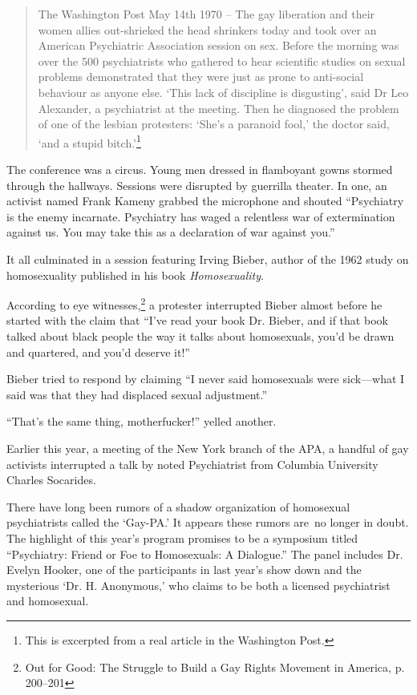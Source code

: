 \begin{quote}

The Washington Post May 14th 1970 -- The gay liberation and their women allies out-shrieked the head shrinkers today and took over an American Psychiatric Association session on sex. Before the morning was over the 500 psychiatrists who gathered to hear scientific studies on sexual problems demonstrated that they were just as prone to anti-social behaviour as anyone else. `This lack of discipline is disgusting', said Dr Leo Alexander, a psychiatrist at the meeting. Then he diagnosed the problem of one of the lesbian protesters: `She's a paranoid fool,' the doctor said, `and a stupid bitch.'\footnote{This is excerpted from a real article in the Washington Post.}
\end{quote}

The conference was a circus. Young men dressed in flamboyant gowns stormed through the hallways. Sessions were disrupted by guerrilla theater. In one, an activist named Frank Kameny grabbed the microphone and shouted ``Psychiatry is the enemy incarnate. Psychiatry has waged a relentless war of extermination against us. You may take this as a declaration of war against you.''

It all culminated in a session featuring Irving Bieber, author of the 1962 study on homosexuality published in his book \emph{Homosexuality}.

According to eye witnesses,\footnote{Out for Good: The Struggle to Build a Gay Rights Movement in America, p. 200--201} a protester interrupted Bieber almost before he started with the claim that ``I've read your book Dr. Bieber, and if that book talked about black people the way it talks about homosexuals, you'd be drawn and quartered, and you'd deserve it!'' 

Bieber tried to respond by claiming ``I never said homosexuals were sick---what I said was that they had displaced sexual adjustment.'' 

``That's the same thing, motherfucker!'' yelled another.

Earlier this year, a meeting of the New York branch of the APA, a handful of gay activists interrupted a talk by noted Psychiatrist from Columbia University Charles Socarides.

There have long been rumors of a shadow organization of homosexual psychiatrists called the `Gay-PA.' It appears these rumors are no longer in doubt. The highlight of this year's program promises to be a symposium titled ``Psychiatry: Friend or Foe to Homosexuals: A Dialogue.'' The panel includes Dr. Evelyn Hooker, one of the participants in last year's show down and the mysterious `Dr. H. Anonymous,' who claims to be both a licensed psychiatrist and homosexual.

